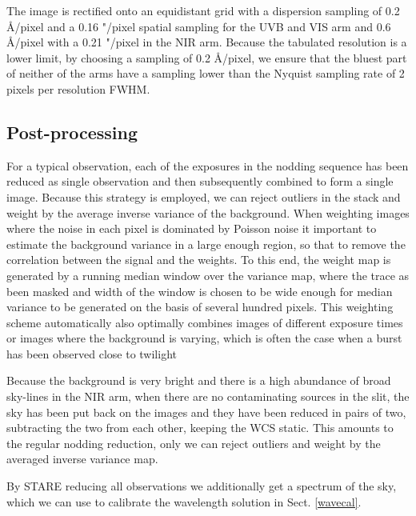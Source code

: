 \documentclass{aa}    %
\begin{document}
The image is rectified onto an equidistant grid with a dispersion sampling of
0.2 \AA/pixel and a 0.16 "/pixel spatial sampling for the UVB and VIS arm and
0.6 \AA/pixel with a 0.21 "/pixel in the NIR arm.  Because the tabulated
resolution is a lower limit, by choosing a sampling of 0.2 \AA/pixel, we ensure
that the bluest part of neither of the arms have a sampling lower than the
Nyquist sampling rate of 2 pixels per resolution FWHM.

\subsection{Post-processing} \label{postproc}

For a typical observation, each of the exposures in the nodding sequence has
been reduced as single observation and then subsequently combined to form a
single image. Because this strategy is employed, we can reject outliers in the
stack and weight by the average inverse variance of the background. When
weighting images where the noise in each pixel is dominated by Poisson noise it
important to estimate the background variance in a large enough region, so that
to remove the correlation between the signal and the weights. To this end, the
weight map is generated by a running median window over the variance map, where
the trace as been masked and width of the window is chosen to be wide enough for
median variance to be generated on the basis of several hundred pixels. This
weighting scheme automatically also optimally combines images of different
exposure times or images where the background is varying, which is often the
case when a burst has been observed close to twilight

Because the background is very bright and there is a high abundance of broad
sky-lines in the NIR arm, when there are no contaminating sources in the slit,
the sky has been put back on the images and they have been reduced in pairs of
two, subtracting the two from each other, keeping the WCS static. This amounts
to the regular nodding reduction, only we can reject outliers and weight by the
averaged inverse variance map.

By STARE reducing all observations we additionally get a spectrum of the sky,
which we can use to calibrate the wavelength solution in Sect. \ref{wavecal}.


\end{document}
